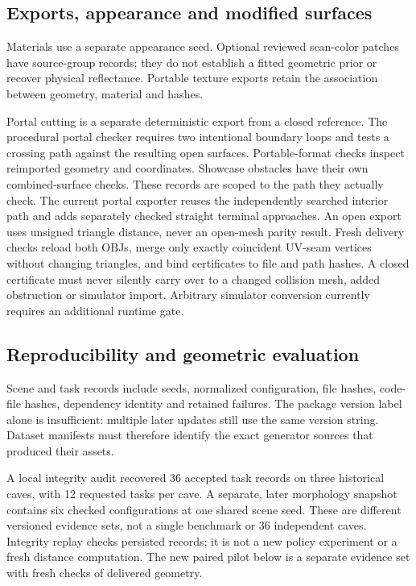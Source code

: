 \subsection{Exports, appearance and modified surfaces}
Materials use a separate appearance seed. Optional reviewed scan-color patches
have source-group records; they do not establish a fitted geometric prior or
recover physical reflectance. Portable texture exports retain the association
between geometry, material and hashes.

Portal cutting is a separate deterministic export from a closed reference.
The procedural portal checker requires two intentional boundary loops and
tests a crossing path against the resulting open surfaces. Portable-format
checks inspect reimported geometry and coordinates. Showcase obstacles have
their own combined-surface checks. These records are scoped to the path they
actually check. The current portal exporter reuses the independently searched
interior path and adds separately checked straight terminal approaches.
An open export uses unsigned triangle distance, never an open-mesh parity
result. Fresh delivery checks reload both OBJs, merge only exactly coincident
UV-seam vertices without changing triangles, and bind certificates to file
and path hashes. A closed certificate must never silently
carry over to a changed collision mesh, added obstruction or simulator import.
Arbitrary simulator conversion currently requires an additional runtime gate.

\subsection{Reproducibility and geometric evaluation}
Scene and task records include seeds, normalized configuration, file hashes,
code-file hashes, dependency identity and retained failures. The package
version label alone is insufficient: multiple later updates still use the
same version string. Dataset manifests must therefore identify the exact
generator sources that produced their assets.

A local integrity audit recovered 36 accepted task records on three historical
caves, with 12 requested tasks per cave. A separate, later morphology snapshot
contains six checked configurations at one shared scene seed. These are
different versioned evidence sets, not a single benchmark or 36 independent
caves. Integrity replay checks persisted records; it is not a new policy
experiment or a fresh distance computation. The new paired pilot below is a
separate evidence set with fresh checks of delivered geometry.
